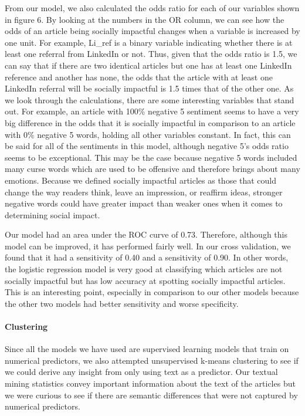 \documentclass[10pt,letterpaper]{article}
\begin{document}
From our model, we also calculated the odds ratio for each of our
variables shown in figure 6. By looking at the numbers in the OR column,
we can see how the odds of an article being socially impactful changes
when a variable is increased by one unit. For example, Li\_ref is a
binary variable indicating whether there is at least one referral from
LinkedIn or not. Thus, given that the odds ratio is 1.5, we can say that
if there are two identical articles but one has at least one LinkedIn
reference and another has none, the odds that the article with at least
one LinkedIn referral will be socially impactful is 1.5 times that of
the other one. As we look through the calculations, there are some
interesting variables that stand out. For example, an article with 100\%
negative 5 sentiment seems to have a very big difference in the odds
that it is socially impactful in comparison to an article with 0\%
negative 5 words, holding all other variables constant. In fact, this
can be said for all of the sentiments in this model, although negative
5's odds ratio seems to be exceptional. This may be the case because
negative 5 words included many curse words which are used to be
offensive and therefore brings about many emotions. Because we defined
socially impactful articles as those that could change the way readers
think, leave an impression, or reaffirm ideas, stronger negative words
could have greater impact than weaker ones when it comes to determining
social impact.

Our model had an area under the ROC curve of 0.73. Therefore, although
this model can be improved, it has performed fairly well. In our cross
validation, we found that it had a sensitivity of 0.40 and a sensitivity
of 0.90. In other words, the logistic regression model is very good at
classifying which articles are not socially impactful but has low
accuracy at spotting socially impactful articles. This is an interesting
point, especially in comparison to our other models because the other
two models had better sensitivity and worse specificity.

\hypertarget{clustering}{%
\paragraph{Clustering}\label{clustering}}

Since all the models we have used are supervised learning models that
train on numerical predictors, we also attempted unsupervised k-means
clustering to see if we could derive any insight from only using text as
a predictor. Our textual mining statistics convey important information
about the text of the articles but we were curious to see if there are
semantic differences that were not captured by numerical predictors.
\end{document}

